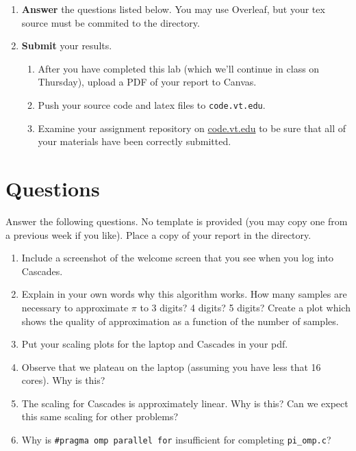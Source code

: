 \documentclass[letter]{article}
\newcommand{\mypath}[1]{\texttt{\path{#1}}}
\begin{document}
\begin{enumerate}
    \item \textbf{Answer} the questions listed below.  You may use Overleaf, but your tex source must be commited to the \mypath{reports/} directory.

    \item \textbf{Submit} your results.
        \begin{enumerate}
            \item After you have completed this lab (which we'll continue in class on Thursday), upload a PDF of your report to Canvas.
            \item Push your source code and latex files to \texttt{code.vt.edu}.
            \item Examine your assignment repository on \url{code.vt.edu} to be sure that all of your materials have been correctly submitted.
        \end{enumerate}
   
\end{enumerate}

\pagebreak
\section*{Questions}

    Answer the following questions.  No template is provided (you may copy one from a previous week if you like).  Place a copy of your report in the \mypath{reports/} directory.

    \begin{enumerate}
        \item Include a screenshot of the welcome screen that you see when you log into Cascades. 
        \item Explain in your own words why this algorithm works.  How many samples are necessary to approximate $\pi$ to 3 digits? 4 digits? 5 digits?  Create a plot which shows the quality of approximation as a function of the number of samples.
        \item Put your scaling plots for the laptop and Cascades in your pdf. 
        \item Observe that we plateau on the laptop (assuming you have less that 16 cores). Why is this?
        
        \item The scaling for Cascades is approximately linear. Why is this? Can we expect this same scaling for other problems?
        
        \item Why is \texttt{\#pragma omp parallel for} insufficient for completing \texttt{pi\_omp.c}?
        
    \end{enumerate}
\end{document}

